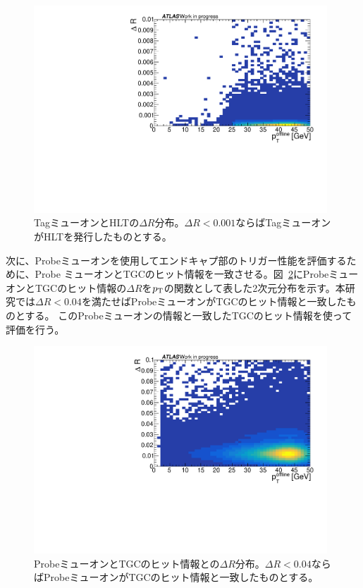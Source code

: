 \begin{figure}[htb]
  \centering
  \includegraphics[clip, width=11cm]{fig/5/dR_tag_HLT.pdf}
  \caption{TagミューオンとHLTの$\Delta R$分布。$\Delta R<0.001$ならばTagミューオンがHLTを発行したものとする。}
  \label{fig:tag_HLT}
\end{figure}

次に、Probeミューオンを使用してエンドキャプ部のトリガー性能を評価するために、Probe ミューオンとTGCのヒット情報を一致させる。図~\ref{fig:Probe_TGC}にProbeミューオンとTGCのヒット情報の$\Delta R$を$p_{\rm{T}}$の関数として表した2次元分布を示す。本研究では$\Delta R<0.04$を満たせばProbeミューオンがTGCのヒット情報と一致したものとする。
このProbeミューオンの情報と一致したTGCのヒット情報を使って評価を行う。

\begin{figure}[htb]
  \centering
  \includegraphics[clip, width=11cm]{fig/5/dR_probe_RoI.pdf}
  \caption{ProbeミューオンとTGCのヒット情報との$\Delta R$分布。$\Delta R< 0.04$ならばProbeミューオンがTGCのヒット情報と一致したものとする。}
  \label{fig:Probe_TGC}
\end{figure}




